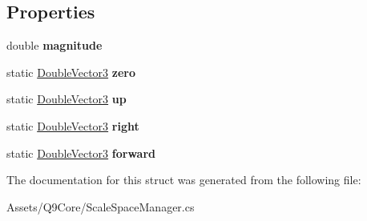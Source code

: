 \subsection*{Properties}
\begin{DoxyCompactItemize}
\item 
\mbox{\label{struct_q9_core_1_1_double_vector3_a2ed778811f6de77d84678efbb6d9eaf0}} 
double {\bfseries magnitude}
\item 
\mbox{\label{struct_q9_core_1_1_double_vector3_a596e65675fc8efc48cf0265136da80c8}} 
static \mbox{\hyperlink{struct_q9_core_1_1_double_vector3}{Double\+Vector3}} {\bfseries zero}
\item 
\mbox{\label{struct_q9_core_1_1_double_vector3_aa7923918015f4cbd5e30acc3c9803e93}} 
static \mbox{\hyperlink{struct_q9_core_1_1_double_vector3}{Double\+Vector3}} {\bfseries up}
\item 
\mbox{\label{struct_q9_core_1_1_double_vector3_a6008bb0396d719504410ef2fff67dc5b}} 
static \mbox{\hyperlink{struct_q9_core_1_1_double_vector3}{Double\+Vector3}} {\bfseries right}
\item 
\mbox{\label{struct_q9_core_1_1_double_vector3_a752f42661ebe7c1db4cef3664e7b2c42}} 
static \mbox{\hyperlink{struct_q9_core_1_1_double_vector3}{Double\+Vector3}} {\bfseries forward}
\end{DoxyCompactItemize}


The documentation for this struct was generated from the following file\+:\begin{DoxyCompactItemize}
\item 
Assets/\+Q9\+Core/Scale\+Space\+Manager.\+cs\end{DoxyCompactItemize}
